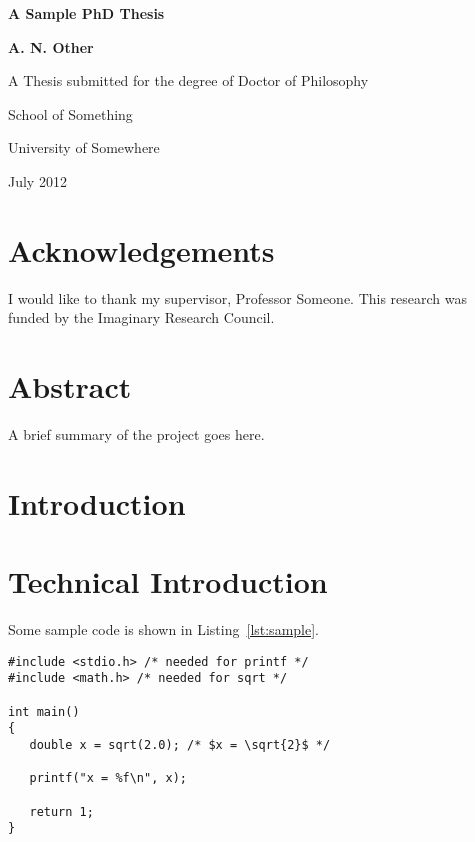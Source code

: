 \documentclass[oneside,12pt]{scrbook}
\theoremstyle{plain}
\theoremstyle{definition}
\theoremstyle{remark}
\begin{document}
\begin{titlepage}
\centering
\vspace*{1in}
\begin{Large}\bfseries
A Sample PhD Thesis\par
\end{Large}
\vspace{1.5in}
\begin{large}\bfseries
A. N. Other\par
\end{large}
\vfill
A Thesis submitted for the degree of Doctor of Philosophy
\par
\vspace{0.5in}
School of Something
\par
University of Somewhere
\par
\vspace{0.5in}
July 2012
\par
\end{titlepage}

\doublespacing

\frontmatter
\tableofcontents
\listoffigures
\listoftables
\lstlistoflistings

\chapter{Acknowledgements}

I would like to thank my supervisor, Professor Someone. This
research was funded by the Imaginary Research Council.

\chapter{Abstract}

A brief summary of the project goes here.

\mainmatter

\chapter{Introduction}
\label{ch:intro}

\lipsum

\chapter{Technical Introduction}
\label{ch:techintro}

Some sample code is shown in Listing~\ref{lst:sample}.

\begin{lstlisting}[mathescape=true,caption={Sample},label={lst:sample}]
#include <stdio.h> /* needed for printf */
#include <math.h> /* needed for sqrt */

int main()
{
   double x = sqrt(2.0); /* $x = \sqrt{2}$ */

   printf("x = %f\n", x);

   return 1;
}
\end{lstlisting} 
\end{document}
